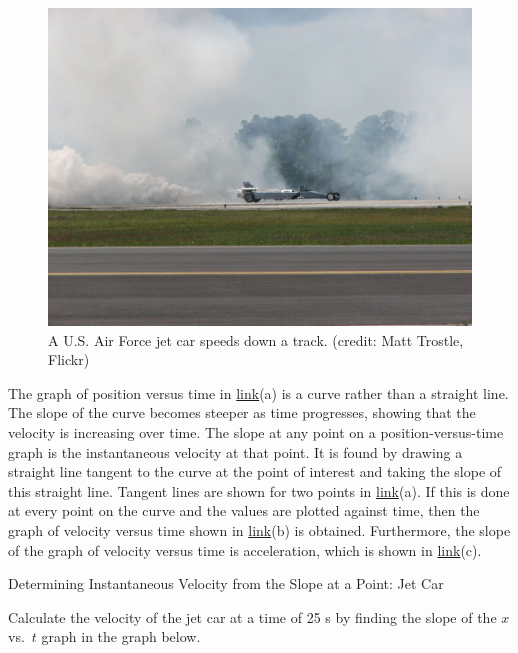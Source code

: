 \documentclass[
]{book}
\begin{document}
\begin{figure}
\hypertarget{import-auto-id3583460}{%
\centering
\includegraphics{images/Figure_02_07_03a.jpg}
\caption{A U.S. Air Force jet car speeds down a track. (credit: Matt Trostle,
Flickr)}\label{import-auto-id3583460}
}
\end{figure}

The graph of position versus time in
\protect\hyperlink{import-auto-id3596921}{link}(a) is a curve
rather than a straight line. The slope of the curve becomes steeper as
time progresses, showing that the velocity is increasing over time. The
slope at any point on a position-versus-time graph is the instantaneous
velocity at that point. It is found by drawing a straight line tangent
to the curve at the point of interest and taking the slope of this
straight line. Tangent lines are shown for two points in
\protect\hyperlink{import-auto-id3596921}{link}(a). If this is
done at every point on the curve and the values are plotted against
time, then the graph of velocity versus time shown in
\protect\hyperlink{import-auto-id3596921}{link}(b) is obtained.
Furthermore, the slope of the graph of velocity versus time is
acceleration, which is shown in
\protect\hyperlink{import-auto-id3596921}{link}(c).

\hypertarget{fs-id1516659}{}
Determining Instantaneous Velocity from the Slope at a Point: Jet Car

Calculate the velocity of the jet car at a time of 25 s by finding the
slope of the \(x{}\) vs.~\(t{}\) graph in the graph below.
\end{document}
